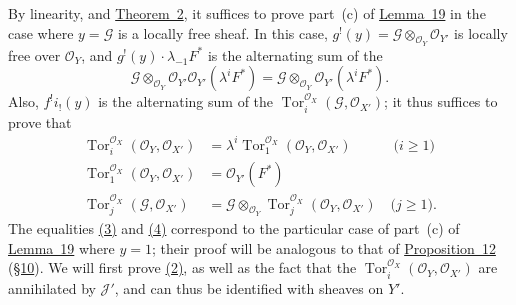 \documentclass{article}
\newcommand{\scr}[1]{{\mathscr{#1}}}
\renewcommand{\geq}{\geqslant}
\DeclareMathOperator{\Tor}{Tor}
\newcommand{\oldpage}[1]{\marginpar{\footnotesize$\Big\vert$ \textit{p.~#1}}}
\begin{document}
By linearity, and \hyperref[theorem2]{Theorem~2}, it suffices to prove part~(c) of \hyperref[lemma19]{Lemma~19} in the case where $y=\scr{G}$ is a locally free sheaf.
In this case, $g^!(y)=\scr{G}\otimes_{\scr{O}_Y}\scr{O}_{Y'}$ is locally free over $\scr{O}_Y$, and $g^!(y)\cdot\lambda_{-1}F^*$ is the alternating sum of the
\[
  \scr{G} \otimes_{\scr{O}_Y} \scr{O}_{Y'} \scr{O}_{Y'}(\lambda^i F^*)
  = \scr{G} \otimes_{\scr{O}_Y} \scr{O}_{Y'}(\lambda^i F^*).
\]
Also, $f^!i_!(y)$ is the alternating sum of the $\Tor_i^{\scr{O}_X}(\scr{G},\scr{O}_{X'})$;
it thus suffices to prove that
\begin{align*}
  \label{section15equation2}
    \Tor_i^{\scr{O}_X}(\scr{O}_Y,\scr{O}_{X'}) &= \lambda^i\Tor_1^{\scr{O}_X}(\scr{O}_Y,\scr{O}_{X'})
    \qquad\quad\mbox{($i\geq1$)}
    \tag{2}
\\
  \label{section15equation3}
    \Tor_1^{\scr{O}_X}(\scr{O}_Y,\scr{O}_{X'}) &= \scr{O}_{Y'}(F^*)
    \tag{3}
\\
  \label{section15equation4}
    \Tor_j^{\scr{O}_X}(\scr{G},\scr{O}_{X'}) &= \scr{G}\otimes_{\scr{O}_Y}\Tor_j^{\scr{O}_X}(\scr{O}_Y,\scr{O}_{X'})
    \quad\mbox{($j\geq1$).}
    \tag{4}
\end{align*}
\oldpage{131}
The equalities \hyperref[section15equation3]{(3)} and \hyperref[section15equation4]{(4)} correspond to the particular case of part~(c) of \hyperref[lemma19]{Lemma~19} where $y=1$;
their proof will be analogous to that of \hyperref[proposition12]{Proposition~12} (\hyperref[section10]{\S10}).
We will first prove \hyperref[section15equation2]{(2)}, as well as the fact that the $\Tor_i^{\scr{O}_X}(\scr{O}_Y,\scr{O}_{X'})$ are annihilated by $\scr{J}'$, and can thus be identified with sheaves on $Y'$.
\end{document}
